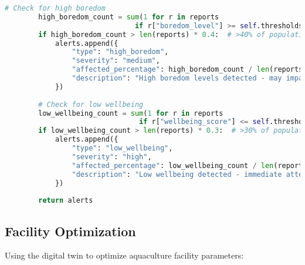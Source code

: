 \documentclass[11pt,a4paper]{article}
\begin{document}
\begin{lstlisting}[language=Python]
        # Check for high boredom
        high_boredom_count = sum(1 for r in reports
                               if r["boredom_level"] >= self.thresholds["high_boredom"])
        if high_boredom_count > len(reports) * 0.4:  # >40% of population
            alerts.append({
                "type": "high_boredom",
                "severity": "medium",
                "affected_percentage": high_boredom_count / len(reports) * 100,
                "description": "High boredom levels detected - may impair learning and development"
            })
        
        # Check for low wellbeing
        low_wellbeing_count = sum(1 for r in reports
                                if r["wellbeing_score"] <= self.thresholds["low_wellbeing"])
        if low_wellbeing_count > len(reports) * 0.3:  # >30% of population
            alerts.append({
                "type": "low_wellbeing",
                "severity": "high",
                "affected_percentage": low_wellbeing_count / len(reports) * 100,
                "description": "Low wellbeing detected - immediate attention required"
            })
            
        return alerts
\end{lstlisting}

\subsection{Facility Optimization}
Using the digital twin to optimize aquaculture facility parameters:
\end{document}
